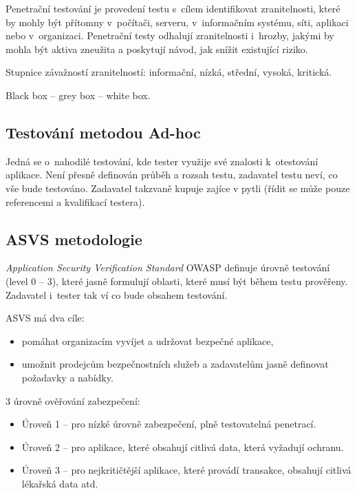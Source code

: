 Penetrační testování je provedení testu s~cílem identifikovat zranitelnosti, které by mohly být přítomny v~počítači, serveru, v~informačním systému, síti, aplikaci nebo v~organizaci.
Penetrační testy odhalují zranitelnosti i~hrozby, jakými by mohla být aktiva zneužita a poskytují návod, jak snížit existující riziko.

Stupnice závažností zranitelností: informační, nízká, střední, vysoká, kritická.

Black box -- grey box -- white box.


\subsection{Testování metodou Ad-hoc}

Jedná se o~nahodilé testování, kde tester využije své znalosti k~otestování aplikace.
Není přesně definován průběh a rozsah testu, zadavatel testu neví, co vše bude testováno.
Zadavatel takzvaně kupuje zajíce v pytli (řídit se může pouze referencemi a kvalifikací testera).


\subsection{ASVS metodologie}

\textit{Application Security Verification Standard} OWASP definuje úrovně testování (level 0 -- 3), které jasně formulují oblasti, které musí být během testu prověřeny.
Zadavatel i~tester tak ví co bude obsahem testování.

ASVS má dva cíle:
\begin{itemize}
    \item pomáhat organizacím vyvíjet a udržovat bezpečné aplikace,
    \item umožnit prodejcům bezpečnostních služeb a zadavatelům jasně definovat požadavky a nabídky.
\end{itemize}

3 úrovně ověřování zabezpečení:
\begin{itemize}
    \item Úroveň 1 -- pro nízké úrovně zabezpečení, plně testovatelná penetrací.
    \item Úroveň 2 -- pro aplikace, které obsahují citlivá data, která vyžadují ochranu.
    \item Úroveň 3 -- pro nejkritičtější aplikace, které provádí transakce, obsahují citlivá lékařská data atd.
\end{itemize}


